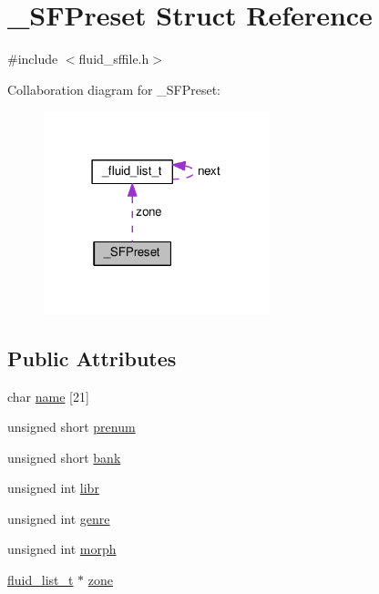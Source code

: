 \hypertarget{struct__SFPreset}{}\section{\+\_\+\+S\+F\+Preset Struct Reference}
\label{struct__SFPreset}


{\ttfamily \#include $<$fluid\+\_\+sffile.\+h$>$}



Collaboration diagram for \+\_\+\+S\+F\+Preset\+:
\nopagebreak
\begin{figure}[H]
\begin{center}
\leavevmode
\includegraphics[width=186pt]{struct__SFPreset__coll__graph}
\end{center}
\end{figure}
\subsection*{Public Attributes}
\begin{DoxyCompactItemize}
\item 
char \hyperlink{struct__SFPreset_a9bce811f9e012c795f4e079a9f1b5319}{name} \mbox{[}21\mbox{]}
\item 
unsigned short \hyperlink{struct__SFPreset_ac6f87e02df4e0db458980a4081c32b20}{prenum}
\item 
unsigned short \hyperlink{struct__SFPreset_ac7f0374d4f0394823498cd2516ae73bb}{bank}
\item 
unsigned int \hyperlink{struct__SFPreset_a07bedf3924791fb6e7ea3f087f3ec9ef}{libr}
\item 
unsigned int \hyperlink{struct__SFPreset_af9cc747ea8940f135414d8c0f2f3e545}{genre}
\item 
unsigned int \hyperlink{struct__SFPreset_a8a996531692bb67fd45eac98ddee7451}{morph}
\item 
\hyperlink{fluid__list_8h_a3ef7535d4290862c0af118569223bd89}{fluid\+\_\+list\+\_\+t} $\ast$ \hyperlink{struct__SFPreset_aa3fa5312b26b583cc1fc6b1c6ad3d3eb}{zone}
\end{DoxyCompactItemize}


